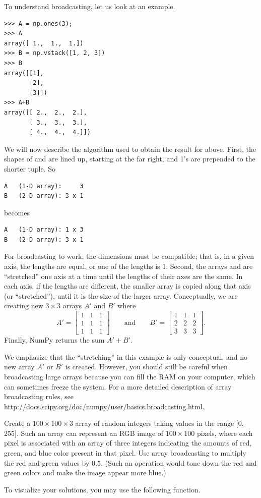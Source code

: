 To understand broadcasting, let us look at an example. 
\begin{lstlisting}
>>> A = np.ones(3);
>>> A
array([ 1.,  1.,  1.])
>>> B = np.vstack([1, 2, 3])
>>> B
array([[1],
       [2],
       [3]])
>>> A+B
array([[ 2.,  2.,  2.],
       [ 3.,  3.,  3.],
       [ 4.,  4.,  4.]])
\end{lstlisting}
We will now describe the algorithm used to obtain the result for  above. 
First, the shapes of  and  are lined up, starting at the far right, and 1's are prepended to the shorter tuple. So
\begin{lstlisting}
A   (1-D array):     3
B   (2-D array): 3 x 1
\end{lstlisting}
becomes
\begin{lstlisting}
A   (1-D array): 1 x 3
B   (2-D array): 3 x 1
\end{lstlisting}
For broadcasting to work, the dimensions must be compatible; that is, in a given axis, the lengths are equal, or one of the lengths is 1. 
Second, the arrays  and  are ``stretched'' one axis at a time until the lengths of their axes are the same. 
In each axis, if the lengths are different, the smaller array is copied along that axis (or ``stretched''), until it is the size of the larger array. 
Conceptually, we are creating new $3 \times 3$ arrays $A'$ and $B'$ where
\[
A' = \left[ \begin{array}{ccc}
1 & 1 & 1\\
1 & 1 & 1\\
1 & 1 & 1 \end{array} \right] \qquad \text{and} \qquad B' =  \left[ \begin{array}{ccc}
1 & 1 & 1\\
2 & 2 & 2\\
3 & 3 & 3\end{array} \right].
\]
Finally, NumPy returns the sum $A'+B'$.

We emphasize that the ``stretching'' in this example is only conceptual, and no new array $A'$ or $B'$ is created. However, 
you should still be careful when broadcasting large arrays because you can fill the 
RAM on your computer, which can sometimes freeze the system.
For a more detailed description of array broadcasting rules, see 
\url{http://docs.scipy.org/doc/numpy/user/basics.broadcasting.html}.

\begin{problem}
Create a $100\times100\times3$ array of random integers taking values in the range 
[0, 255]. Such an array can represent an RGB image of $100\times100$ pixels, 
where each pixel is associated with an array of three integers indicating the 
amounts of red, green, and blue color present in that pixel.
Use array broadcasting to multiply the red and green values by $0.5$. 
(Such an operation would tone down the red and green colors and make the 
image appear more blue.) 

To visualize your solutions, you may use the following function.
 
\end{problem}

